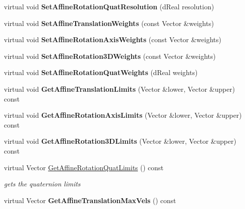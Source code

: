 \begin{DoxyCompactItemize}
\item 
\hypertarget{classOpenRAVE_1_1RobotBase_a8622f54ae85efd7c567931e1d38e3528}{
virtual void {\bfseries SetAffineRotationQuatResolution} (dReal resolution)}
\label{classOpenRAVE_1_1RobotBase_a8622f54ae85efd7c567931e1d38e3528}

\item 
\hypertarget{classOpenRAVE_1_1RobotBase_af0424e83f813d7a0ee9f81f0681850ad}{
virtual void {\bfseries SetAffineTranslationWeights} (const Vector \&weights)}
\label{classOpenRAVE_1_1RobotBase_af0424e83f813d7a0ee9f81f0681850ad}

\item 
\hypertarget{classOpenRAVE_1_1RobotBase_a423aba3715d11bb70958bf2ee4bec667}{
virtual void {\bfseries SetAffineRotationAxisWeights} (const Vector \&weights)}
\label{classOpenRAVE_1_1RobotBase_a423aba3715d11bb70958bf2ee4bec667}

\item 
\hypertarget{classOpenRAVE_1_1RobotBase_a44c44a092857697901d3398fae0a4662}{
virtual void {\bfseries SetAffineRotation3DWeights} (const Vector \&weights)}
\label{classOpenRAVE_1_1RobotBase_a44c44a092857697901d3398fae0a4662}

\item 
\hypertarget{classOpenRAVE_1_1RobotBase_a215b8d8f4ee61d9928e8f6526e09961f}{
virtual void {\bfseries SetAffineRotationQuatWeights} (dReal weights)}
\label{classOpenRAVE_1_1RobotBase_a215b8d8f4ee61d9928e8f6526e09961f}

\item 
\hypertarget{classOpenRAVE_1_1RobotBase_ac09ced409b9d1f3d8f02001b7872b67d}{
virtual void {\bfseries GetAffineTranslationLimits} (Vector \&lower, Vector \&upper) const }
\label{classOpenRAVE_1_1RobotBase_ac09ced409b9d1f3d8f02001b7872b67d}

\item 
\hypertarget{classOpenRAVE_1_1RobotBase_ac115b354d225eca0e1709514df2c0b84}{
virtual void {\bfseries GetAffineRotationAxisLimits} (Vector \&lower, Vector \&upper) const }
\label{classOpenRAVE_1_1RobotBase_ac115b354d225eca0e1709514df2c0b84}

\item 
\hypertarget{classOpenRAVE_1_1RobotBase_a9a7744d25dfee40289c3627c92600164}{
virtual void {\bfseries GetAffineRotation3DLimits} (Vector \&lower, Vector \&upper) const }
\label{classOpenRAVE_1_1RobotBase_a9a7744d25dfee40289c3627c92600164}

\item 
virtual Vector \hyperlink{classOpenRAVE_1_1RobotBase_ab4bb2e38267520019e902a1a5d4abbd3}{GetAffineRotationQuatLimits} () const 
\begin{DoxyCompactList}\small\item\em gets the quaternion limits \item\end{DoxyCompactList}\item 
\hypertarget{classOpenRAVE_1_1RobotBase_a7e786845d8bf9466a6e247aebd5c5b0a}{
virtual Vector {\bfseries GetAffineTranslationMaxVels} () const }
\label{classOpenRAVE_1_1RobotBase_a7e786845d8bf9466a6e247aebd5c5b0a}


\end{DoxyCompactItemize}
